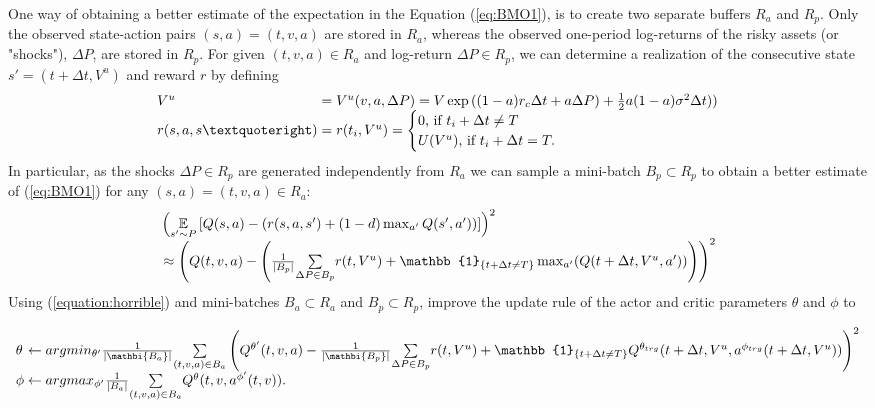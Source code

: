 One way of obtaining  a better estimate of the expectation in the Equation (\ref {eq:BMO1}), is to create two separate buffers $R_a$ and $R_p$. Only the observed state-action pairs $(s,a)=(t,v,a)$ are stored in $R_a$, whereas the observed one-period log-returns of the risky assets (or "shocks"), $\Delta P$, are stored in $R_p$. For given $(t,v,a) \in R_a$ and log-return $\Delta P \in R_p$, we can determine a realization of the consecutive state $s'=(t+\Delta t, V^u)$ and reward $r$ by defining
 \begin{equation}\label{equation:wu3}
    \begin{array}{l@{}l}
V^u
 &{}= V^u(v,a,\Delta P) =  V\exp{((1-a)r_c\Delta t + a\Delta P) + \frac{1}{2}a(1-a)\sigma^2\Delta t))}\\
 r(s,a,s’)  &{}= r(t_i,V^u) = \begin{cases}
                    0  \textrm{, if }t_i +\Delta t \neq T  \\
                    U(V^{u}) \textrm{, if }t_i +\Delta t = T. \\
                \end{cases}
 \end{array}
\end{equation}
In particular, as the shocks $\Delta P \in R_p$ are generated independently from $R_a$ we can sample a mini-batch $B_p \subset R_p$ to obtain a better estimate of (\ref{eq:BMO1}) for any $(s,a)=(t,v,a) \in R_a$:
\begin{equation}\label{equation:horrible}
\begin{array}{l@{}l}
&{}\left (\underset{s' \sim P}{{\mathbb E}}\left[Q(s,a)-\left(r(s,a,s') + (1-d)\max_{a'} Q(s', a')\right)\right] \right )^2\\ &{}\approx \left( Q(t,v,a) - \left(\frac{1}{|B_p|}\underset{\Delta P \in B_p}{\sum}r(t,V^u) + \mathbb{1}_{\{t+\Delta t \neq T\}}\max_{a'}(Q(t+\Delta t,V^u,a'))\right)\right)^2
\end{array}
\end{equation}
Using (\ref{equation:horrible}) and mini-batches $B_a \subset R_a$ and $B_p \subset R_p$, improve the update rule of the actor and critic parameters $\theta$ and $\phi$ to 

\begin{equation}
 \begin{array}{l@{}l}
    
\theta &{}\leftarrow  argmin_{\theta '}\frac{1}{|\mathbi{B_a}|}\underset{(t,v,a) \in B_a}{\sum}\left( Q^{\theta '}(t,v,a) - \frac{1}{|\mathbi{B_p}|}\underset{\Delta P \in B_p}{\sum} r(t,V^u) + \mathbb{1}_{\{t+\Delta t \neq T\}}  Q^{\theta_{trg}}(t+\Delta t,V^u, a^{\phi_{trg}}(t+\Delta t,V^u))\right) ^2 \\
\phi &{} \leftarrow argmax_{\phi '} \frac{1}{|{B_a}|} \underset{(t,v,a) \in B_a}{\sum} Q^{\theta}(t,v,a^{\phi '}(t,v )).
 \end{array}
  \end{equation}

